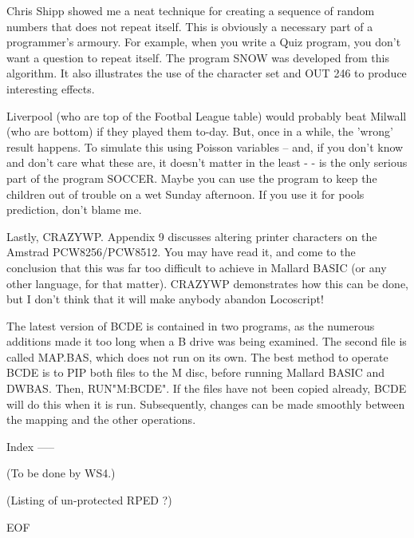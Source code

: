 Chris  Shipp  showed  me a neat technique for creating a  sequence  of  random 
numbers  that does not repeat itself. This is obviously a necessary part of  a 
programmer's  armoury. For example, when you write a Quiz program,  you  don't 
want  a  question to repeat itself. The program SNOW was developed  from  this 
algorithm.  It  also illustrates the use of the character set and OUT  246  to 
produce interesting effects.

Liverpool  (who  are  top of the Footbal League  table)  would  probably  beat 
Milwall (who are bottom) if they played them to-day. But, once in a while, the 
'wrong'  result happens. To simulate this using Poisson variables --  and,  if 
you don't know and don't care what these are, it doesn't matter in the least -
-  is  the  only serious part of the program SOCCER. Maybe  you  can  use  the 
program to keep the children out of trouble on a wet Sunday afternoon. If  you 
use it for pools prediction, don't blame me.

Lastly,  CRAZYWP.  Appendix  9 discusses altering printer  characters  on  the 
Amstrad PCW8256/PCW8512. You may have read it, and come to the conclusion that 
this was far too difficult to achieve in Mallard BASIC (or any other language, 
for that matter). CRAZYWP demonstrates how this can be done, but I don't think 
that it will make anybody abandon Locoscript!

The  latest  version  of BCDE is contained in two programs,  as  the  numerous 
additions made it too long when a B drive was being examined. The second  file 
is  called MAP.BAS, which does not run on its own. The best method to  operate 
BCDE  is  to PIP both files to the M disc, before running  Mallard  BASIC  and 
DWBAS. Then, RUN"M:BCDE". If the files have not been copied already, BCDE will 
do this when it is run. Subsequently, changes can be made smoothly between the 
mapping and the other operations.


Index
-----

(To be done by WS4.)

(Listing of un-protected RPED ?)


EOF

